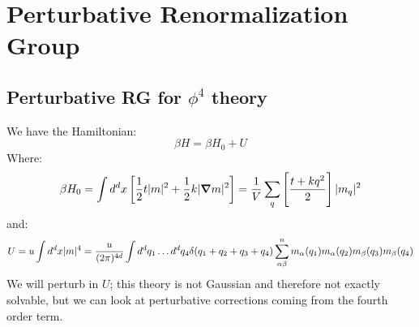 \section{Perturbative Renormalization Group}
\subsection{Perturbative RG for $\phi^4$ theory}
We have the Hamiltonian:
\begin{equation}
    \beta H = \beta H_0 + U
\end{equation}
Where:
\begin{equation}
    \beta H_0 = \int d^dx \left[\frac{1}{2}t\abs{m}^2 + \frac{1}{2}k\abs{\nabla m}^2\right] = \frac{1}{V}\sum_q \left[\frac{t + kq^2}{2}\right]\abs{m_q}^2
\end{equation}
and:
\begin{equation}
    U = u\int d^dx \lvert m \rvert^4 = \frac{u}{(2\pi)^{4d}}\int d^dq_1 \ldots d^dq_4 \delta(q_1 + q_2 + q_3 + q_4) \sum_{\alpha\beta}^n m_\alpha(q_1)m_\alpha(q_2)m_\beta(q_3)m_\beta(q_4)
\end{equation}
We will perturb in $U$; this theory is not Gaussian and therefore not exactly solvable, but we can look at perturbative corrections coming from the fourth order term. 

